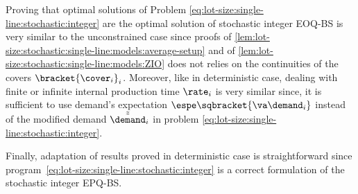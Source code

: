 Proving that optimal solutions of Problem \eqref{eq:lot-size:single-line:stochastic:integer} are the optimal solution of stochastic integer EOQ-BS is very similar to the unconstrained case since proofs of \cref{lem:lot-size:stochastic:single-line:models:average-setup} and of \cref{lem:lot-size:stochastic:single-line:models:ZIO} does not relies on the continuities of the covers $\bracket{\cover_i}_i$.
Moreover, like in deterministic case, dealing with finite or infinite internal production time $\rate_i$ is very similar since, it is sufficient to use demand's expectation $\espe\sqbracket{\va\demand_i}$ instead of the modified demand $\tilde{\tilde{\demand}}_i$ in problem \eqref{eq:lot-size:single-line:stochastic:integer}.


Finally, adaptation of results proved in deterministic case is straightforward since program~\eqref{eq:lot-size:single-line:stochastic:integer} is a correct formulation of the stochastic integer EPQ-BS.

